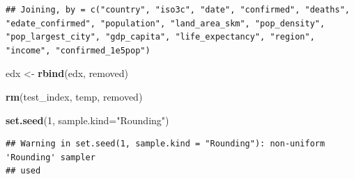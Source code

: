 \documentclass[]{article}
\newenvironment{Shaded}{\begin{snugshade}}{\end{snugshade}}
\newcommand{\DataTypeTok}[1]{\textcolor[rgb]{0.13,0.29,0.53}{#1}}
\newcommand{\DecValTok}[1]{\textcolor[rgb]{0.00,0.00,0.81}{#1}}
\newcommand{\FloatTok}[1]{\textcolor[rgb]{0.00,0.00,0.81}{#1}}
\newcommand{\KeywordTok}[1]{\textcolor[rgb]{0.13,0.29,0.53}{\textbf{#1}}}
\newcommand{\NormalTok}[1]{#1}
\newcommand{\OperatorTok}[1]{\textcolor[rgb]{0.81,0.36,0.00}{\textbf{#1}}}
\newcommand{\OtherTok}[1]{\textcolor[rgb]{0.56,0.35,0.01}{#1}}
\newcommand{\StringTok}[1]{\textcolor[rgb]{0.31,0.60,0.02}{#1}}
\begin{document}
\begin{verbatim}
## Joining, by = c("country", "iso3c", "date", "confirmed", "deaths", "edate_confirmed", "population", "land_area_skm", "pop_density", "pop_largest_city", "gdp_capita", "life_expectancy", "region", "income", "confirmed_1e5pop")
\end{verbatim}

\begin{Shaded}
\begin{Highlighting}[]
\NormalTok{edx <-}\StringTok{ }\KeywordTok{rbind}\NormalTok{(edx, removed)}
\end{Highlighting}
\end{Shaded}

\begin{Shaded}
\begin{Highlighting}[]
\KeywordTok{rm}\NormalTok{(test_index, temp, removed)}
\end{Highlighting}
\end{Shaded}

\begin{Shaded}
\begin{Highlighting}[]
\KeywordTok{set.seed}\NormalTok{(}\DecValTok{1}\NormalTok{, }\DataTypeTok{sample.kind=}\StringTok{"Rounding"}\NormalTok{)}
\end{Highlighting}
\end{Shaded}

\begin{verbatim}
## Warning in set.seed(1, sample.kind = "Rounding"): non-uniform 'Rounding' sampler
## used
\end{verbatim}

\begin{Shaded}
\end{Shaded}
\end{document}
